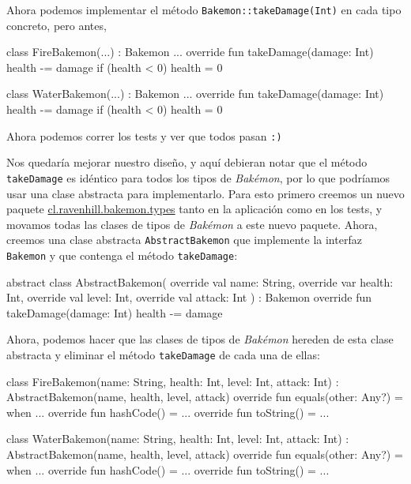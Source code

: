  Ahora podemos implementar el método \texttt{Bakemon::takeDamage(Int)} en cada tipo concreto, pero
  antes, 

  \begin{kotlin}
    class FireBakemon(...) : Bakemon {
      ...
      override fun takeDamage(damage: Int) {
        health -= damage
        if (health < 0) {
          health = 0
        }
      }
    }
  \end{kotlin}

  \begin{kotlin}
    class WaterBakemon(...) : Bakemon {
      ...
      override fun takeDamage(damage: Int) {
        health -= damage
        if (health < 0) {
          health = 0
        }
      }
    }
  \end{kotlin}
  
  Ahora podemos correr los tests y ver que todos pasan \texttt{:)}

  Nos quedaría mejorar nuestro diseño, y aquí debieran notar que el método \texttt{takeDamage}
  es idéntico para todos los tipos de \textit{Bakémon}, por lo que podríamos usar una clase
  abstracta para implementarlo.
  Para esto primero creemos un nuevo paquete \url{cl.ravenhill.bakemon.types} tanto en la aplicación
  como en los tests, y movamos todas las clases de tipos de \textit{Bakémon} a este nuevo paquete.
  Ahora, creemos una clase abstracta \texttt{AbstractBakemon} que implemente la interfaz
  \texttt{Bakemon} y que contenga el método \texttt{takeDamage}:

  \begin{kotlin}
    abstract class AbstractBakemon(
      override val name: String,
      override var health: Int,
      override val level: Int,
      override val attack: Int
    ) : Bakemon {
      override fun takeDamage(damage: Int) {
        health -= damage
      }
    }
  \end{kotlin}

  Ahora, podemos hacer que las clases de tipos de \textit{Bakémon} hereden de esta clase abstracta
  y eliminar el método \texttt{takeDamage} de cada una de ellas:

  \begin{kotlin}
    class FireBakemon(name: String, health: Int, level: Int, attack: Int) :
        AbstractBakemon(name, health, level, attack) {
      override fun equals(other: Any?) = when {...}
      override fun hashCode() = ...
      override fun toString() = ...
    }
  \end{kotlin}

  \begin{kotlin}
    class WaterBakemon(name: String, health: Int, level: Int, attack: Int) :
        AbstractBakemon(name, health, level, attack) {
      override fun equals(other: Any?) = when {...}
      override fun hashCode() = ...
      override fun toString() = ...
    }
  \end{kotlin}